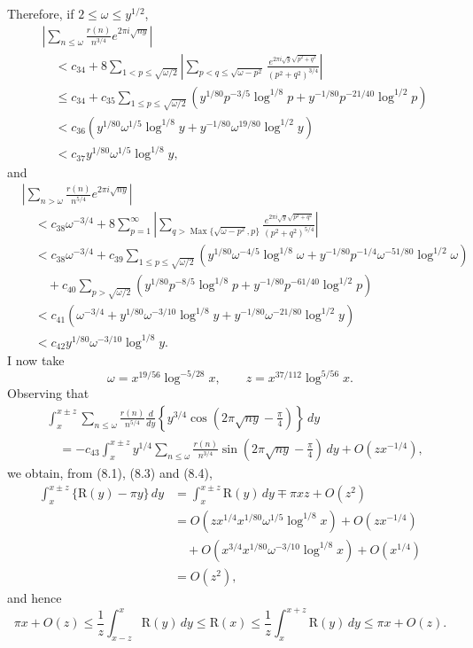 \documentclass[11pt]{article}
\newcommand{\Max}{\operatorname{Max}}
\newcommand{\dd}{\,d}
\begin{document}
Therefore, if $2\leq\omega\leq y^{1/2}$,
\begin{align*}
&\left|\sum_{n\leq\omega}\frac{r(n)}{n^{3/4}}e^{2\pi i\sqrt{ny}}\right| \\
&\quad<c_{34}+8\sum_{1<p\leq\sqrt{\omega/2}}
 \left|\sum_{p<q\leq\sqrt{\omega-p^2}}
 \frac{e^{2\pi i\sqrt y\sqrt{p^2+q^2}}}{(p^2+q^2)^{3/4}}\right| \\
&\quad\leq c_{34}+c_{35}\sum_{1\leq p\leq\sqrt{\omega/2}}
 \left(y^{1/80}p^{-3/5}\log^{1/8}p
 +y^{-1/80}p^{-21/40}\log^{1/2}p\right) \\
&\quad<c_{36}\left(y^{1/80}\omega^{1/5}\log^{1/8}y
 +y^{-1/80}\omega^{19/80}\log^{1/2}y\right) \\
&\quad<c_{37}y^{1/80}\omega^{1/5}\log^{1/8}y,
\tag{8.3}
\end{align*}
and
\begin{align*}
&\left|\sum_{n>\omega}\frac{r(n)}{n^{5/4}}e^{2\pi i\sqrt{ny}}\right| \\
&\quad<c_{38}\omega^{-3/4}+8\sum_{p=1}^{\infty}
 \left|\sum_{q>\Max\{\sqrt{\omega-p^2},p\}}
 \frac{e^{2\pi i\sqrt y\sqrt{p^2+q^2}}}{(p^2+q^2)^{5/4}}\right| \\
&\quad<c_{38}\omega^{-3/4}
 +c_{39}\sum_{1\leq p\leq\sqrt{\omega/2}}
 \left(y^{1/80}\omega^{-4/5}\log^{1/8}\omega
 +y^{-1/80}p^{-1/4}\omega^{-51/80}\log^{1/2}\omega\right) \\
&\qquad+c_{40}\sum_{p>\sqrt{\omega/2}}
 \left(y^{1/80}p^{-8/5}\log^{1/8}p
 +y^{-1/80}p^{-61/40}\log^{1/2}p\right) \\
&\quad<c_{41}\left(\omega^{-3/4}
 +y^{1/80}\omega^{-3/10}\log^{1/8}y
 +y^{-1/80}\omega^{-21/80}\log^{1/2}y\right) \\
&\quad<c_{42}y^{1/80}\omega^{-3/10}\log^{1/8}y.
\tag{8.4}
\end{align*}
I now take
\[
 \omega=x^{19/56}\log^{-5/28}x,\qquad
 z=x^{37/112}\log^{5/56}x.
\]
Observing that
\begin{align*}
&\int_x^{x\pm z}\sum_{n\leq\omega}\frac{r(n)}{n^{5/4}}
 \frac{d}{dy}\left\{y^{3/4}
 \cos\!\left(2\pi\sqrt{ny}-\frac\pi4\right)\right\}\dd y \\
&\quad=-c_{43}\int_x^{x\pm z}y^{1/4}
 \sum_{n\leq\omega}\frac{r(n)}{n^{3/4}}
 \sin\!\left(2\pi\sqrt{ny}-\frac\pi4\right)\dd y
 +O\!\left(zx^{-1/4}\right),
\end{align*}
we obtain, from (8.1), (8.3) and (8.4),
\begin{align*}
 \int_x^{x\pm z}\{\mathrm{R}(y)-\pi y\}\dd y
 &=\int_x^{x\pm z}\mathrm{R}(y)\dd y\mp\pi xz+O(z^2) \\
 &=O\!\left(zx^{1/4}x^{1/80}\omega^{1/5}\log^{1/8}x\right)
   +O\!\left(zx^{-1/4}\right) \\
 &\quad+O\!\left(x^{3/4}x^{1/80}\omega^{-3/10}\log^{1/8}x\right)
   +O\!\left(x^{1/4}\right) \\
 &=O(z^2),
\end{align*}
and hence
\[
 \pi x+O(z)\leq\frac1z\int_{x-z}^{x}\mathrm{R}(y)\dd y
 \leq\mathrm{R}(x)\leq\frac1z\int_x^{x+z}\mathrm{R}(y)\dd y
 \leq\pi x+O(z).
\]
\end{document}
